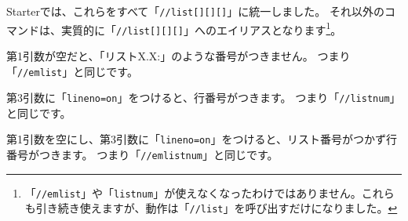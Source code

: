 Starterでは、これらをすべて「\texttt{//list[][][]}」に統一しました。
それ以外のコマンドは、実質的に「\texttt{//list[][][]}」へのエイリアスとなります\footnote{「\texttt{//emlist}」や「\texttt{listnum}」が使えなくなったわけではありません。これらも引き続き使えますが、動作は「\texttt{//list}」を呼び出すだけになりました。}。

\begin{starteritemize}
\item 第1引数が空だと、「リストX.X:」のような番号がつきません。
   つまり「\texttt{//emlist}」と同じです。
\item 第3引数に「\texttt{lineno=on}」をつけると、行番号がつきます。
   つまり「\texttt{//listnum}」と同じです。
\item 第1引数を空にし、第3引数に「\texttt{lineno=on}」をつけると、リスト番号がつかず行番号がつきます。
   つまり「\texttt{//emlistnum}」と同じです。
\end{starteritemize}

\begin{starterprogram}\end{starterprogram}
\noindent
{}

\starterresult
{}
\label{4k2ny}
\begin{starterprogram}\end{starterprogram}
\label{}
\begin{starterprogram}\end{starterprogram}
\label{970bl}
\begin{starterprogram}
\end{starterprogram}
\label{}
\begin{starterprogram}
\end{starterprogram}
\endstarterresult

